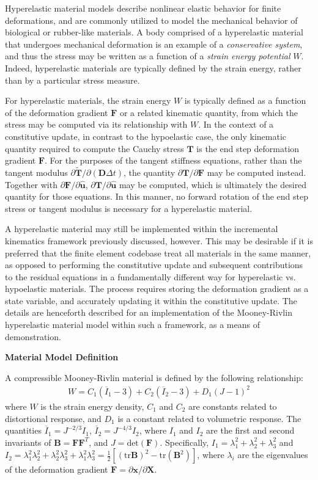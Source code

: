 Hyperelastic material models describe nonlinear elastic behavior for finite deformations, and are commonly utilized to model the mechanical behavior of biological or rubber-like materials. A body comprised of a hyperelastic material that undergoes mechanical deformation is an example of a  \textit{conservative system}, and thus the stress may be written as a function of a \textit{strain energy potential} $W$. Indeed, hyperelastic materials are typically defined by the strain energy, rather than by a particular stress measure.

For hyperelastic materials, the strain energy $W$ is typically defined as a function of the deformation gradient $\bm{F}$ or a related kinematic quantity, from which the stress may be computed via its relationship with $W$. In the context of a constitutive update, in contrast to the hypoelastic case, the only kinematic quantity required to compute the Cauchy stress $\bm{T}$ is the end step deformation gradient $\bm{F}$. For the purposes of the tangent stiffness equations, rather than the tangent modulus ${\partial \tilde{\bm{T}}}/{\partial (\bm{D}\Delta{t})}$, the quantity ${\partial \bm{T}}/{\partial \bm{F}}$ may be computed instead. Together with $\partial \bm{F}/\partial \hat{\bm{u}}$, $\partial \bm{T}/\partial \hat{\bm{u}}$ may be computed, which is ultimately the desired quantity for those equations. In this manner, no forward rotation of the end step stress or tangent modulus is necessary for a hyperelastic material.

A hyperelastic material may still be implemented within the incremental kinematics framework previously discussed, however. This may be desirable if it is preferred that the finite element codebase treat all materials in the same manner, as opposed to performing the constitutive update and subsequent contributions to the residual equations in a fundamentally different way for hyperelastic vs. hypoelastic materials. The process requires storing the deformation gradient as a state variable, and accurately updating it within the constitutive update. The details are henceforth described for an implementation of the Mooney-Rivlin hyperelastic material model within such a framework, as a means of demonstration.

\textbf{Material Model Definition}

A compressible Mooney-Rivlin material is defined by the following relationship:
\begin{align}
W = C_1(\overline{I}_1 - 3) + C_2(\overline{I}_2 - 3) + D_1(J - 1)^2
\end{align}
where $W$ is the strain energy density, $C_1$ and $C_2$ are constants related to distortional response, and $D_1$ is a constant related to volumetric response. The quantities $\overline{I}_1 = J^{-2/3}I_1$, $\overline{I}_2 = J^{-4/3}I_2$, where $I_1$ and $I_2$ are the first and second invariants of $\bm{B} = {\bm F}{\bm F}^T$, and $J = \text{det}({\bm F})$. Specifically, $I_1 = \lambda_1^2 + \lambda_2^2 + \lambda_3^2$ and $I_2 = \lambda_1^2\lambda_2^2 + \lambda_2^2\lambda_3^2 + \lambda_1^2\lambda_3^2 = \frac{1}{2}[(\text{tr}{\bm B})^2 - \text{tr}({\bm B}^2)]$, where $\lambda_i$ are the eigenvalues of the deformation gradient ${\bm F} = {\partial {\bm x}}/{\partial {\bm X}}$.

